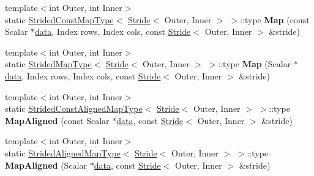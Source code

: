 \begin{Indent}
\begin{DoxyCompactItemize}
\item 
\mbox{\label{class_eigen_1_1_plain_object_base_a1a3a8fd56500cda9a96189cd55472203}} 
{\footnotesize template$<$int Outer, int Inner$>$ }\\static \mbox{\hyperlink{struct_eigen_1_1_plain_object_base_1_1_strided_const_map_type}{Strided\+Const\+Map\+Type}}$<$ \mbox{\hyperlink{class_eigen_1_1_stride}{Stride}}$<$ Outer, Inner $>$ $>$\+::type {\bfseries Map} (const Scalar $\ast$\mbox{\hyperlink{class_eigen_1_1_plain_object_base_ac25699535374b1854cf8494e44ad31b2}{data}}, Index rows, Index cols, const \mbox{\hyperlink{class_eigen_1_1_stride}{Stride}}$<$ Outer, Inner $>$ \&stride)
\item 
\mbox{\label{class_eigen_1_1_plain_object_base_ad41d75bfc07b50b2912f99212a7265ed}} 
{\footnotesize template$<$int Outer, int Inner$>$ }\\static \mbox{\hyperlink{struct_eigen_1_1_plain_object_base_1_1_strided_map_type}{Strided\+Map\+Type}}$<$ \mbox{\hyperlink{class_eigen_1_1_stride}{Stride}}$<$ Outer, Inner $>$ $>$\+::type {\bfseries Map} (Scalar $\ast$\mbox{\hyperlink{class_eigen_1_1_plain_object_base_ac25699535374b1854cf8494e44ad31b2}{data}}, Index rows, Index cols, const \mbox{\hyperlink{class_eigen_1_1_stride}{Stride}}$<$ Outer, Inner $>$ \&stride)
\item 
\mbox{\label{class_eigen_1_1_plain_object_base_aadc343ac6294b26d8e2033a1c1400600}} 
{\footnotesize template$<$int Outer, int Inner$>$ }\\static \mbox{\hyperlink{struct_eigen_1_1_plain_object_base_1_1_strided_const_aligned_map_type}{Strided\+Const\+Aligned\+Map\+Type}}$<$ \mbox{\hyperlink{class_eigen_1_1_stride}{Stride}}$<$ Outer, Inner $>$ $>$\+::type {\bfseries Map\+Aligned} (const Scalar $\ast$\mbox{\hyperlink{class_eigen_1_1_plain_object_base_ac25699535374b1854cf8494e44ad31b2}{data}}, const \mbox{\hyperlink{class_eigen_1_1_stride}{Stride}}$<$ Outer, Inner $>$ \&stride)
\item 
\mbox{\label{class_eigen_1_1_plain_object_base_abd8ce90b470cfa30cae08f9c673912c9}} 
{\footnotesize template$<$int Outer, int Inner$>$ }\\static \mbox{\hyperlink{struct_eigen_1_1_plain_object_base_1_1_strided_aligned_map_type}{Strided\+Aligned\+Map\+Type}}$<$ \mbox{\hyperlink{class_eigen_1_1_stride}{Stride}}$<$ Outer, Inner $>$ $>$\+::type {\bfseries Map\+Aligned} (Scalar $\ast$\mbox{\hyperlink{class_eigen_1_1_plain_object_base_ac25699535374b1854cf8494e44ad31b2}{data}}, const \mbox{\hyperlink{class_eigen_1_1_stride}{Stride}}$<$ Outer, Inner $>$ \&stride)

\end{DoxyCompactItemize}
\end{Indent}
